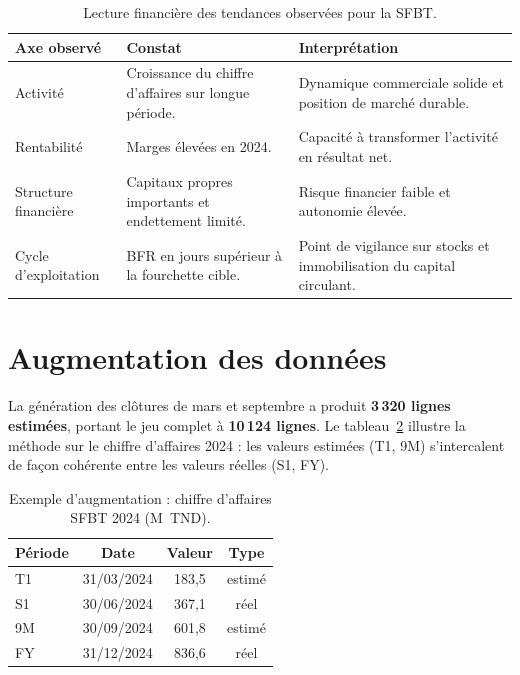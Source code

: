 \begin{table}[H]
\centering
\caption[Lecture financière des tendances SFBT]{Lecture financière des tendances observées pour la SFBT.}
\label{tab:tendances_sfbt}
\begin{tabularx}{\linewidth}{|p{3.2cm}|X|X|}
\hline
\textbf{Axe observé} & \textbf{Constat} & \textbf{Interprétation} \\ \hline
Activité & Croissance du chiffre d'affaires sur longue période. & Dynamique commerciale solide et position de marché durable. \\ \hline
Rentabilité & Marges élevées en 2024. & Capacité à transformer l'activité en résultat net. \\ \hline
Structure financière & Capitaux propres importants et endettement limité. & Risque financier faible et autonomie élevée. \\ \hline
Cycle d'exploitation & BFR en jours supérieur à la fourchette cible. & Point de vigilance sur stocks et immobilisation du capital circulant. \\ \hline
\end{tabularx}
\end{table}


\section{Augmentation des données}
\label{sec:realaug}
\par La génération des clôtures de mars et septembre a produit \textbf{3\,320
lignes estimées}, portant le jeu complet à \textbf{10\,124 lignes}. Le
tableau~\ref{tab:augment} illustre la méthode sur le chiffre d'affaires 2024 :
les valeurs estimées (T1, 9M) s'intercalent de façon cohérente entre les valeurs
réelles (S1, FY).

\begin{table}[H]
\centering
\caption[Exemple d'augmentation]{Exemple d'augmentation : chiffre d'affaires SFBT 2024 (M~TND).}
\label{tab:augment}
\begin{tabular}{|l|c|c|c|}
\hline
\textbf{Période} & \textbf{Date} & \textbf{Valeur} & \textbf{Type} \\ \hline
T1 & 31/03/2024 & 183,5 & estimé \\ \hline
S1 & 30/06/2024 & 367,1 & réel \\ \hline
9M & 30/09/2024 & 601,8 & estimé \\ \hline
FY & 31/12/2024 & 836,6 & réel \\ \hline
\end{tabular}
\end{table}

